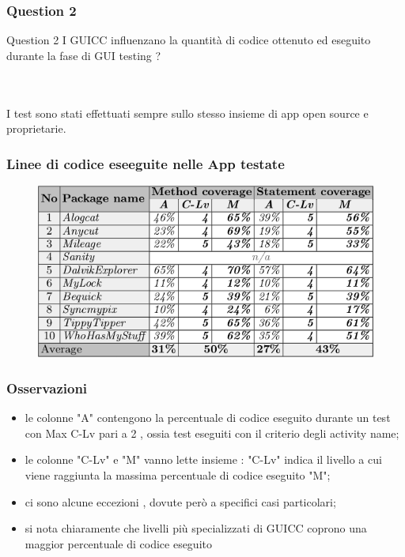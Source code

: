 \documentclass[12pt]{beamer}
\begin{document}

\begin{frame}
\frametitle{Question 2}
\begin{block}{Question 2}
 I GUICC influenzano la quantit\`a di codice ottenuto ed eseguito durante la fase di GUI testing  ? 
\end{block}
\\~\\

I test sono stati effettuati sempre sullo stesso insieme di app open source e proprietarie.

\end{frame}


\begin{frame}
\frametitle{Linee di codice eseeguite nelle App testate}
\begin{figure}
\includegraphics[width=0.8\linewidth]{images/LOCcoverage.png}
\end{figure}
\end{frame}


\begin{frame}
\frametitle{Osservazioni}

\begin{itemize}
\item le colonne "A" contengono la percentuale di codice eseguito durante un test con Max C-Lv pari a 2 , ossia test eseguiti con il criterio degli activity name;

\item le colonne "C-Lv" e "M" vanno lette insieme : "C-Lv" indica il livello a cui viene raggiunta la massima percentuale di codice eseguito "M";

\item ci sono alcune eccezioni , dovute per\`o a specifici casi particolari;

\item si nota chiaramente che livelli pi\`u specializzati di GUICC coprono una maggior percentuale di codice eseguito
\end{itemize}


\end{frame}
\end{document}
